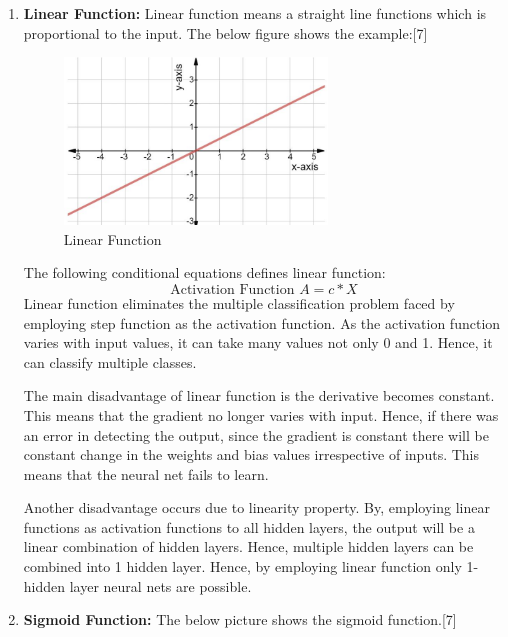 \documentclass{IEEEtran}
\begin{document}
\begin{enumerate}
\item \textbf{Linear Function:} Linear function means a straight line functions which is proportional to the input. The below figure shows the example:[7]
\begin{figure}[h]
    \centering
    \captionsetup{justification=centering}
    \includegraphics[width=7cm]{lin}
    \caption{Linear Function}
    \label{fig: Linear Function}
\end{figure}
The following conditional equations defines linear function:
\begin{equation*}
\text{Activation Function  } A = c*X
\end{equation*}
Linear function eliminates the multiple classification problem faced by employing step function as the activation function. As the activation function varies with input values, it can take many values not only 0 and 1. Hence, it can classify multiple classes.

The main disadvantage of linear function is the derivative becomes constant. This means that the gradient no longer varies with input. Hence,  if there was an error in detecting the output, since the gradient is constant there will be constant change in the weights and bias values irrespective of inputs. This means that the neural net fails to learn.

Another disadvantage occurs due to linearity property. By, employing linear functions as activation functions to all hidden layers, the output will be a linear combination of hidden layers. Hence, multiple hidden layers can be combined into 1 hidden layer. Hence,  by employing linear function only 1-hidden layer neural nets are possible.
\newline
\item \textbf{Sigmoid Function:} The below picture shows the sigmoid function.[7]


\end{enumerate}
\end{document}
